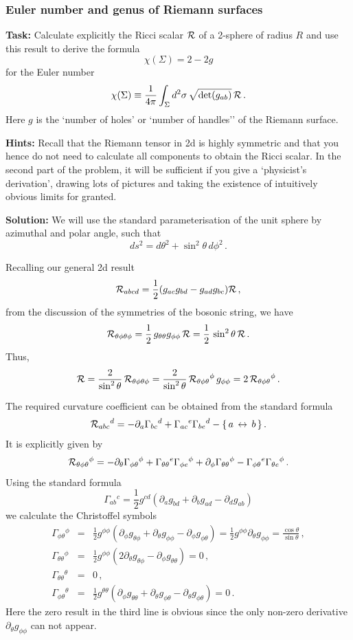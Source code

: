 \documentclass[12pt]{article}
\newcommand{\be}{\begin{equation}}
\newcommand{\ee}{\end{equation}}
\newcommand{\bea}{\begin{eqnarray}}
\newcommand{\eea}{\end{eqnarray}}
\numberwithin{equation}{section}
\begin{document}
\subsubsection{Euler number and genus of Riemann surfaces}

{\bf Task:} Calculate explicitly the Ricci scalar ${\cal R}$ of a 2-sphere of radius $R$ and use this result to derive the formula
\be
\chi(\Sigma)=2-2g\label{chg}
\ee
for the Euler number 
\be
\chi(\Sigma)\equiv \frac{1}{4\pi}\int_\Sigma d^2\sigma\,\sqrt{\mbox{det}(g_{ab})}\,{\cal R}\,.\label{cint}
\ee
Here $g$ is the `number of holes' or `number of handles'' of the Riemann surface. 

\noindent
{\bf Hints:} Recall that the Riemann tensor in 2d is highly symmetric and that you hence do not need to calculate all components to obtain the Ricci scalar. In the second part of the problem, it will be sufficient if you give a `physicist's derivation', drawing lots of pictures and taking the existence of intuitively obvious limits for granted. 

\noindent
{\bf Solution:} We will use the standard parameterisation of the unit sphere by azimuthal and polar angle, such that
\be
ds^2=d\theta^2+\sin^2\theta\,d\phi^2\,.
\ee

Recalling our general 2d result
\be
{\cal R}_{abcd}=\frac{1}{2}(g_{ac}g_{bd}-g_{ad}g_{bc}){\cal R}\,,
\ee
from the discussion of the symmetries of the bosonic string, we have
\be
{\cal R}_{\theta\phi\theta\phi}=\frac{1}{2}\,g_{\theta\theta}g_{\phi\phi}\,{\cal R}=\frac{1}{2} \,\sin^2\theta\,{\cal R}\,.
\ee
Thus,
\be
{\cal R}=\frac{2}{\sin^2\theta}\,{\cal R}_{\theta\phi\theta\phi}=
\frac{2}{\sin^2\theta}\,{\cal R}_{\theta\phi\theta}{}^\phi\,g_{\phi\phi}
=2\,{\cal R}_{\theta\phi\theta}{}^\phi\,.
\ee

The required curvature coefficient can be obtained from the standard formula
\be
{\cal R}_{abc}{}^d=-\partial_a\Gamma_{bc}{}^d+\Gamma_{ac}{}^e\Gamma_{be}{}^d- \{\,a\,\leftrightarrow\,b\,\}\,.
\ee
It is explicitly given by
\be
{\cal R}_{\theta\phi\theta}{}^\phi=-\partial_\theta\Gamma_{\phi\theta}{}^\phi +\Gamma_{\theta\theta}{}^e\Gamma_{\phi e}{}^\phi+\partial_\phi \Gamma_{\theta\theta} {}^\phi-\Gamma_{\phi\theta}{}^e \Gamma_{\theta e}{}^\phi\,.
\ee
Using the standard formula
\be
\Gamma_{ab}{}^c=\frac{1}{2}g^{cd}(\partial_a g_{bd}+\partial_b g_{ad}-\partial_d g_{ab})
\ee
we calculate the Christoffel symbols
\bea
\Gamma_{\phi\theta}{}^\phi&=&\frac{1}{2}g^{\phi\phi}(\partial_\phi g_{\theta\phi}+\partial_\theta g_{\phi\phi}-\partial_\phi g_{\phi\theta}) = \frac{1}{2}g^{\phi\phi}\partial_\theta g_{\phi\phi}=\frac{\cos\theta}{\sin \theta}\,,
\\
\Gamma_{\theta\theta}{}^\phi&=&\frac{1}{2}g^{\phi\phi}(2\partial_\theta g_{\theta\phi} -\partial_\phi g_{\theta\theta}) =0\,,
\\
\Gamma_{\theta\theta}{}^\theta&=&0\,,
\\
\Gamma_{\phi\theta}{}^\theta&=&\frac{1}{2}g^{\theta\theta}(\partial_\phi g_{\theta\theta}+ \partial_\theta g_{\phi\theta} - \partial_\theta g_{\phi\theta}) = 0\,.
\eea
Here the zero result in the third line is obvious since the only non-zero derivative $\partial_\theta g_{\phi\phi}$ can not appear.
\end{document}
